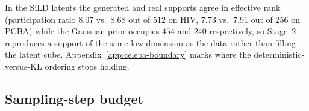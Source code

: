 \begin{table}[h]
\centering
\caption{%
Latent statistics, 10K encodings, seed 42. Dead coordinates and the
standard-deviation ratio (largest over smallest, and ``dead'' meaning
standard deviation below $10^{-3}$) are computed on the \emph{raw} encoder
output; effective rank (participation ratio) is computed after
per-coordinate standardization, on real encodings ($z_{\mathrm{real}}$), on
latents produced by Stage~2 ($z_{\mathrm{gen}}$), and on prior samples
($z_{\mathrm{prior}}$).%
}
\label{tab:collapse_latent}
\small
{}
\end{table}

In the SiLD latents the generated and real supports agree in effective rank
(participation ratio $8.07$ vs.\ $8.68$ out of $512$ on HIV, $7.73$ vs.\
$7.91$ out of $256$ on PCBA) while the Gaussian prior occupies $454$ and
$240$ respectively, so Stage~2 reproduces a support of the same low dimension
as the data rather than filling the latent cube.
Appendix~\ref{app:celeba-boundary} marks where the
deterministic-versus-KL ordering stops holding.

\subsection{Sampling-step budget}
\label{app:steps}

